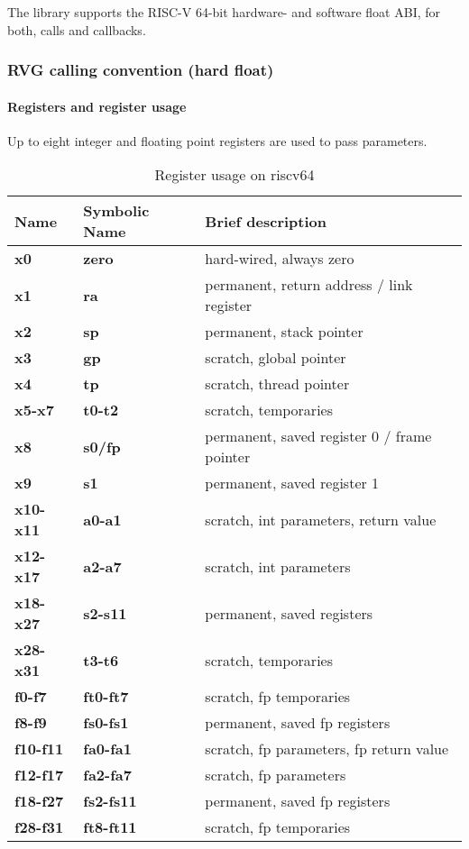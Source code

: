 The  library supports the RISC-V 64-bit hardware- and software float ABI, for both, calls and callbacks.

\subsubsection{RVG calling convention (hard float)}

\paragraph{Registers and register usage}

Up to eight integer and floating point registers are used to pass parameters.

\begin{table}[h]
\begin{tabular*}{0.95\textwidth}{lll}
Name          & Symbolic Name & Brief description\\
\hline
{\bf x0}      & {\bf zero}     & hard-wired, always zero\\
{\bf x1}      & {\bf ra}       & permanent, return address / link register\\
{\bf x2}      & {\bf sp}       & permanent, stack pointer\\
{\bf x3}      & {\bf gp}       & scratch, global pointer\\
{\bf x4}      & {\bf tp}       & scratch, thread pointer\\
{\bf x5-x7}   & {\bf t0-t2}    & scratch, temporaries\\
{\bf x8}      & {\bf s0/fp}    & permanent, saved register 0 / frame pointer\\
{\bf x9}      & {\bf s1}       & permanent, saved register 1\\
{\bf x10-x11} & {\bf a0-a1}    & scratch, int parameters, return value\\
{\bf x12-x17} & {\bf a2-a7}    & scratch, int parameters\\
{\bf x18-x27} & {\bf s2-s11}   & permanent, saved registers\\
{\bf x28-x31} & {\bf t3-t6}    & scratch, temporaries\\
{\bf f0-f7}   & {\bf ft0-ft7}  & scratch, fp temporaries\\
{\bf f8-f9}   & {\bf fs0-fs1}  & permanent, saved fp registers\\
{\bf f10-f11} & {\bf fa0-fa1}  & scratch, fp parameters, fp return value\\
{\bf f12-f17} & {\bf fa2-fa7}  & scratch, fp parameters\\
{\bf f18-f27} & {\bf fs2-fs11} & permanent, saved fp registers\\
{\bf f28-f31} & {\bf ft8-ft11} & scratch, fp temporaries\\

\end{tabular*}
\caption{Register usage on riscv64}
\end{table}

